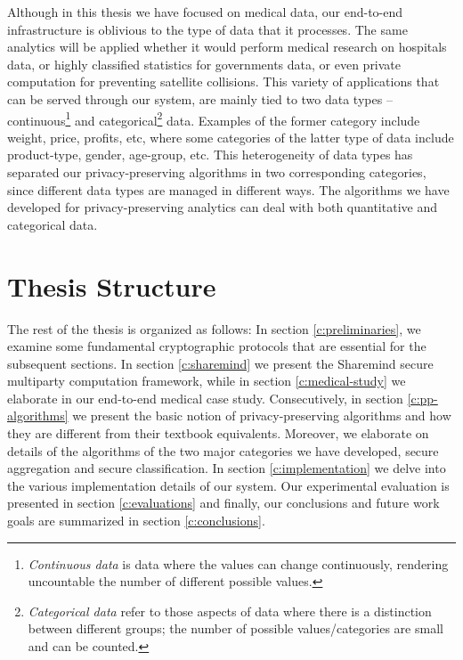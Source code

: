 Although in this thesis we have focused on medical data, our end-to-end infrastructure is oblivious to the type of data that it processes.
The same analytics will be applied whether it would perform medical research on hospitals data, or highly classified statistics for governments data, or even private computation for preventing satellite collisions.
This variety of applications that can be served through our system, are mainly tied to two data types -- continuous\footnote{\textit{Continuous data} is data where the values can change continuously, rendering uncountable the number of different possible values.} and categorical\footnote{\textit{Categorical data} refer to those aspects of data where there is a distinction between different groups; the number of possible values/categories are small and can be counted.} data.
Examples of the former category include weight, price, profits, etc, where some categories of the latter type of data include product-type, gender, age-group, etc.
This heterogeneity of data types has separated our privacy\hyp preserving algorithms in two corresponding categories, since different data types are managed in different ways.
The algorithms we have developed for privacy-preserving analytics can deal with both quantitative and categorical data.




\section{Thesis Structure}\label{s:thesis-structure}
The rest of the thesis is organized as follows: In section \ref{c:preliminaries}, we examine some fundamental cryptographic protocols that are essential for the subsequent sections.
In section \ref{c:sharemind} we present the Sharemind secure multiparty computation framework, while in section \ref{c:medical-study} we elaborate in our end\hyp to\hyp end medical case study.
Consecutively, in section \ref{c:pp-algorithms} we present the basic notion of privacy-preserving algorithms and how they are different from their textbook equivalents.
Moreover, we elaborate on details of the algorithms of the two major categories we have developed, secure aggregation and secure classification.
In section \ref{c:implementation} we delve into the various implementation details of our system.
Our experimental evaluation is presented in section \ref{c:evaluations} and finally, our conclusions and future work goals are summarized in section \ref{c:conclusions}.

